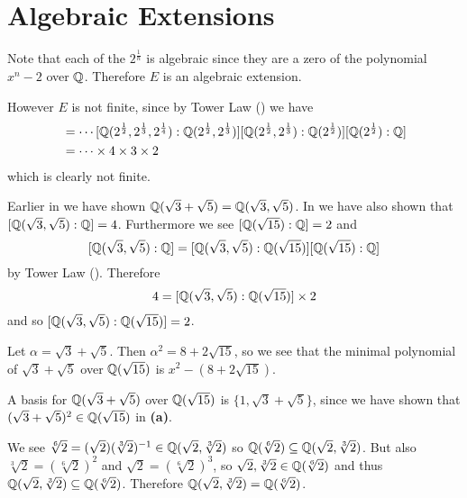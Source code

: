 \section{Algebraic Extensions}
\begin{questions}
    \item Note that each of the $2^{\frac1n}$ is algebraic since they are a zero of the polynomial $x^n - 2$ over $\mathbb{Q}$. Therefore $E$ is an algebraic extension.
    
    However $E$ is not finite, since by Tower Law () we have
    \begin{align*}
        [E: F] &= \cdots[\Q(2^{\frac12},2^{\frac13},2^{\frac14}):\Q(2^{\frac12},2^{\frac13})]
        [\Q(2^{\frac12},2^{\frac13}):\Q(2^{\frac12})][\Q(2^{\frac12}):\Q]\\
        &= \cdots \times 4 \times 3 \times 2
    \end{align*}
    which is clearly not finite.
    
    \item Earlier in  we have shown $\mathbb{Q}(\sqrt3 + \sqrt5) = \mathbb{Q}(\sqrt3,\sqrt5)$. In  we have also shown that $[\mathbb{Q}(\sqrt3,\sqrt5):\mathbb{Q}] = 4$. Furthermore we see $[\mathbb{Q}(\sqrt{15}):\mathbb{Q}] = 2$ and
    \[
        [\mathbb{Q}(\sqrt3,\sqrt5):\mathbb{Q}] = [\mathbb{Q}(\sqrt3,\sqrt5):\mathbb{Q}(\sqrt{15})][\mathbb{Q}(\sqrt{15}):\mathbb{Q}]
    \]
    by Tower Law (). Therefore
    \[
        4 = [\mathbb{Q}(\sqrt3,\sqrt5):\mathbb{Q}(\sqrt{15})]\times2
    \]
    and so $[\mathbb{Q}(\sqrt3,\sqrt5):\mathbb{Q}(\sqrt{15})] = 2$.

    \begin{partquestions}{\alph*}
        \item Let $\alpha = \sqrt3 + \sqrt5$. Then $\alpha^2 = 8 + 2\sqrt{15}$, so we see that the minimal polynomial of $\sqrt3+\sqrt5$ over $\mathbb{Q}(\sqrt{15})$ is $x^2 - (8 + 2\sqrt{15})$.
        
        \item A basis for $\mathbb{Q}(\sqrt3 + \sqrt5)$ over $\mathbb{Q}(\sqrt{15})$ is $\{1, \sqrt3 + \sqrt5\}$, since we have shown that $(\sqrt3 + \sqrt5)^2 \in \mathbb{Q}(\sqrt{15})$ in \textbf{(a)}.
    \end{partquestions}
    
    \item We see $\sqrt[6]2 = (\sqrt2)(\sqrt[3]2)^{-1} \in \mathbb{Q}(\sqrt2, \sqrt[3]2)$ so $\mathbb{Q}(\sqrt[6]2) \subseteq \mathbb{Q}(\sqrt2,\sqrt[3]2)$. But also $\sqrt[3]2 = \left(\sqrt[6]2\right)^2$ and $\sqrt2 = \left(\sqrt[6]2\right)^3$, so $\sqrt2,\sqrt[3]2 \in \mathbb{Q}(\sqrt[6]2)$ and thus $\mathbb{Q}(\sqrt2,\sqrt[3]2) \subseteq \mathbb{Q}(\sqrt[6]2)$. Therefore $\mathbb{Q}(\sqrt2,\sqrt[3]2) = \mathbb{Q}(\sqrt[6]2)$.
    

\end{questions}
